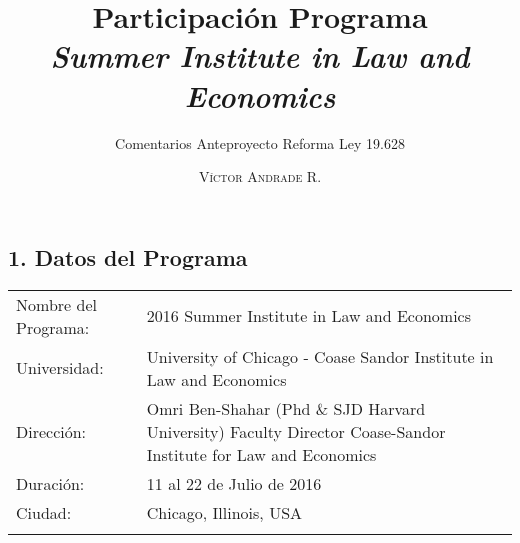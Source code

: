 \documentclass[spanish,]{article}
\title{Participación Programa \\ \textit{Summer Institute in Law and Economics}}
\subtitle{Comentarios Anteproyecto Reforma Ley 19.628}
\date{}
\author{\textsc{Víctor Andrade R.}}
\begin{document}
\maketitle

\subsection{1. Datos del Programa}\label{datos-del-programa}

\begin{longtable}[c]{@{}ll@{}}
\toprule
\begin{minipage}[t]{0.18\columnwidth}\raggedright\strut
Nombre del Programa:
\strut\end{minipage} &
\begin{minipage}[t]{0.76\columnwidth}\raggedright\strut
2016 Summer Institute in Law and Economics
\strut\end{minipage}\tabularnewline
\begin{minipage}[t]{0.18\columnwidth}\raggedright\strut
Universidad:
\strut\end{minipage} &
\begin{minipage}[t]{0.76\columnwidth}\raggedright\strut
University of Chicago - Coase Sandor Institute in Law and Economics
\strut\end{minipage}\tabularnewline
\begin{minipage}[t]{0.18\columnwidth}\raggedright\strut
Dirección:
\strut\end{minipage} &
\begin{minipage}[t]{0.76\columnwidth}\raggedright\strut
Omri Ben-Shahar (Phd \& SJD Harvard University) Faculty Director
Coase-Sandor Institute for Law and Economics
\strut\end{minipage}\tabularnewline
\begin{minipage}[t]{0.18\columnwidth}\raggedright\strut
Duración:
\strut\end{minipage} &
\begin{minipage}[t]{0.76\columnwidth}\raggedright\strut
11 al 22 de Julio de 2016
\strut\end{minipage}\tabularnewline
\begin{minipage}[t]{0.18\columnwidth}\raggedright\strut
Ciudad:
\strut\end{minipage} &
\begin{minipage}[t]{0.76\columnwidth}\raggedright\strut
Chicago, Illinois, USA
\strut\end{minipage}\tabularnewline
\begin{minipage}[t]{0.18\columnwidth}\raggedright\strut

\end{minipage}
\end{longtable}
\end{document}
